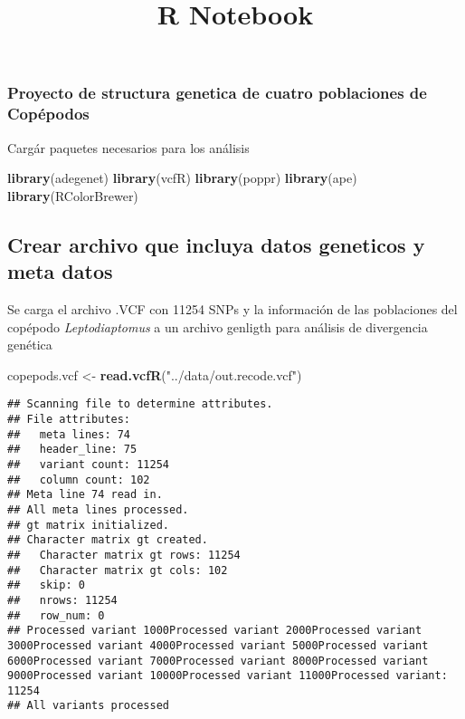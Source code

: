 \documentclass[]{article}
\title{R Notebook}
\author{}
\date{\vspace{-2.5em}}
\newenvironment{Shaded}{\begin{snugshade}}{\end{snugshade}}
\newcommand{\KeywordTok}[1]{\textcolor[rgb]{0.13,0.29,0.53}{\textbf{#1}}}
\newcommand{\NormalTok}[1]{#1}
\newcommand{\StringTok}[1]{\textcolor[rgb]{0.31,0.60,0.02}{#1}}
\begin{document}
\maketitle

\hypertarget{proyecto-de-structura-genetica-de-cuatro-poblaciones-de-copuxe9podos}{%
\subsubsection{Proyecto de structura genetica de cuatro poblaciones de
Copépodos}\label{proyecto-de-structura-genetica-de-cuatro-poblaciones-de-copuxe9podos}}

Cargár paquetes necesarios para los análisis

\begin{Shaded}
\begin{Highlighting}[]
\KeywordTok{library}\NormalTok{(adegenet)}
\KeywordTok{library}\NormalTok{(vcfR)}
\KeywordTok{library}\NormalTok{(poppr)}
\KeywordTok{library}\NormalTok{(ape)}
\KeywordTok{library}\NormalTok{(RColorBrewer)}
\end{Highlighting}
\end{Shaded}

\hypertarget{crear-archivo-que-incluya-datos-geneticos-y-meta-datos}{%
\subsection{Crear archivo que incluya datos geneticos y meta
datos}\label{crear-archivo-que-incluya-datos-geneticos-y-meta-datos}}

Se carga el archivo .VCF con 11254 SNPs y la información de las
poblaciones del copépodo \emph{Leptodiaptomus} a un archivo genligth
para análisis de divergencia genética

\begin{Shaded}
\begin{Highlighting}[]
\NormalTok{copepods.vcf <-}\StringTok{ }\KeywordTok{read.vcfR}\NormalTok{(}\StringTok{"../data/out.recode.vcf"}\NormalTok{)}
\end{Highlighting}
\end{Shaded}

\begin{verbatim}
## Scanning file to determine attributes.
## File attributes:
##   meta lines: 74
##   header_line: 75
##   variant count: 11254
##   column count: 102
## Meta line 74 read in.
## All meta lines processed.
## gt matrix initialized.
## Character matrix gt created.
##   Character matrix gt rows: 11254
##   Character matrix gt cols: 102
##   skip: 0
##   nrows: 11254
##   row_num: 0
## Processed variant 1000Processed variant 2000Processed variant 3000Processed variant 4000Processed variant 5000Processed variant 6000Processed variant 7000Processed variant 8000Processed variant 9000Processed variant 10000Processed variant 11000Processed variant: 11254
## All variants processed
\end{verbatim}
\end{document}
